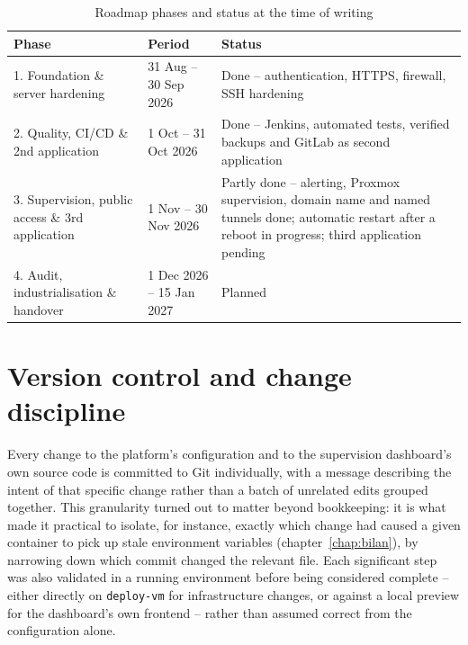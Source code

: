 \begin{table}[h]
  \centering
  \renewcommand{\arraystretch}{1.25}
  \begin{tabularx}{\textwidth}{|p{4.2cm}|p{3.4cm}|X|}
    \hline
    \rowcolor{ucacred!15} \textbf{Phase} & \textbf{Period} & \textbf{Status} \\
    \hline
    1. Foundation \& server hardening & 31 Aug -- 30 Sep 2026 & Done -- authentication, HTTPS, firewall, SSH hardening \\
    \hline
    2. Quality, CI/CD \& 2nd application & 1 Oct -- 31 Oct 2026 & Done -- Jenkins, automated tests, verified backups and GitLab as second application \\
    \hline
    3. Supervision, public access \& 3rd application & 1 Nov -- 30 Nov 2026 & Partly done -- alerting, Proxmox supervision, domain name and named tunnels done; automatic restart after a reboot in progress; third application pending \\
    \hline
    4. Audit, industrialisation \& handover & 1 Dec 2026 -- 15 Jan 2027 & Planned \\
    \hline
  \end{tabularx}
  \caption{Roadmap phases and status at the time of writing}
  \label{tab:roadmap}
\end{table}

\section{Version control and change discipline}
Every change to the platform's configuration and to the supervision dashboard's own source code is committed to Git individually, with a message describing the intent of that specific change rather than a batch of unrelated edits grouped together. This granularity turned out to matter beyond bookkeeping: it is what made it practical to isolate, for instance, exactly which change had caused a given container to pick up stale environment variables (chapter~\ref{chap:bilan}), by narrowing down which commit changed the relevant file. Each significant step was also validated in a running environment before being considered complete -- either directly on \texttt{deploy-vm} for infrastructure changes, or against a local preview for the dashboard's own frontend -- rather than assumed correct from the configuration alone.

